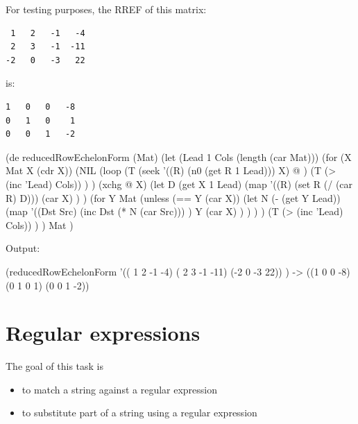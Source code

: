 \pagebreak{}
For testing purposes, the RREF of this matrix:

\begin{verbatim}
 1   2   -1   -4
 2   3   -1  -11
-2   0   -3   22
\end{verbatim}

is:

\begin{verbatim}
1   0   0   -8
0   1   0    1
0   0   1   -2
\end{verbatim}


\begin{wideverbatim}

(de reducedRowEchelonForm (Mat)
   (let (Lead 1  Cols (length (car Mat)))
      (for (X Mat X (cdr X))
         (NIL
            (loop
               (T (seek '((R) (n0 (get R 1 Lead))) X)
                  @ )
               (T (> (inc 'Lead) Cols)) ) )
         (xchg @ X)
         (let D (get X 1 Lead)
            (map
               '((R) (set R (/ (car R) D)))
               (car X) ) )
         (for Y Mat
            (unless (== Y (car X))
               (let N (- (get Y Lead))
                  (map
                     '((Dst Src)
                        (inc Dst (* N (car Src))) )
                     Y
                     (car X) ) ) ) )
         (T (> (inc 'Lead) Cols)) ) )
   Mat )

Output:

(reducedRowEchelonForm
   '(( 1  2  -1   -4) ( 2  3  -1  -11) (-2  0  -3   22)) )
-> ((1 0 0 -8) (0 1 0 1) (0 0 1 -2))

\end{wideverbatim}

\pagebreak{}
\section*{Regular expressions}

The goal of this task is

\begin{itemize}
\item
  to match a string against a regular expression
\item
  to substitute part of a string using a regular expression
\end{itemize}


